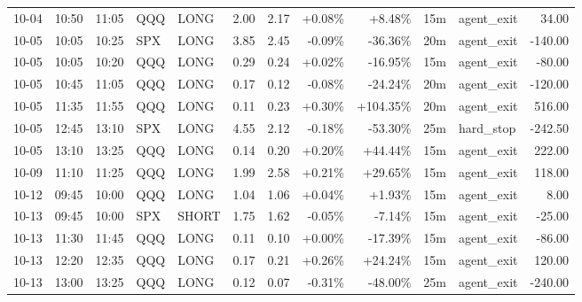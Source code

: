 \documentclass[11pt,a4paper]{article}
\begin{document}
\begin{center}
\begin{longtable}{>{\color{txtmain}}l l l l l r r r r r >{\color{txtmain}}l r}
10-04 & 10:50 & 11:05 & QQQ & LONG & 2.00 & 2.17 & \textcolor{wingreen}{+0.08\%} & \textcolor{wingreen}{+8.48\%} & 15m & agent\_exit & \textcolor{wingreen}{34.00} \\
10-05 & 10:05 & 10:25 & SPX & LONG & 3.85 & 2.45 & \textcolor{lossred}{-0.09\%} & \textcolor{lossred}{-36.36\%} & 20m & agent\_exit & \textcolor{lossred}{-140.00} \\
10-05 & 10:05 & 10:20 & QQQ & LONG & 0.29 & 0.24 & \textcolor{wingreen}{+0.02\%} & \textcolor{lossred}{-16.95\%} & 15m & agent\_exit & \textcolor{lossred}{-80.00} \\
10-05 & 10:45 & 11:05 & QQQ & LONG & 0.17 & 0.12 & \textcolor{lossred}{-0.08\%} & \textcolor{lossred}{-24.24\%} & 20m & agent\_exit & \textcolor{lossred}{-120.00} \\
10-05 & 11:35 & 11:55 & QQQ & LONG & 0.11 & 0.23 & \textcolor{wingreen}{+0.30\%} & \textcolor{wingreen}{+104.35\%} & 20m & agent\_exit & \textcolor{wingreen}{516.00} \\
10-05 & 12:45 & 13:10 & SPX & LONG & 4.55 & 2.12 & \textcolor{lossred}{-0.18\%} & \textcolor{lossred}{-53.30\%} & 25m & hard\_stop & \textcolor{lossred}{-242.50} \\
10-05 & 13:10 & 13:25 & QQQ & LONG & 0.14 & 0.20 & \textcolor{wingreen}{+0.20\%} & \textcolor{wingreen}{+44.44\%} & 15m & agent\_exit & \textcolor{wingreen}{222.00} \\
10-09 & 11:10 & 11:25 & QQQ & LONG & 1.99 & 2.58 & \textcolor{wingreen}{+0.21\%} & \textcolor{wingreen}{+29.65\%} & 15m & agent\_exit & \textcolor{wingreen}{118.00} \\
10-12 & 09:45 & 10:00 & QQQ & LONG & 1.04 & 1.06 & \textcolor{wingreen}{+0.04\%} & \textcolor{wingreen}{+1.93\%} & 15m & agent\_exit & \textcolor{wingreen}{8.00} \\
10-13 & 09:45 & 10:00 & SPX & SHORT & 1.75 & 1.62 & \textcolor{lossred}{-0.05\%} & \textcolor{lossred}{-7.14\%} & 15m & agent\_exit & \textcolor{lossred}{-25.00} \\
10-13 & 11:30 & 11:45 & QQQ & LONG & 0.11 & 0.10 & \textcolor{wingreen}{+0.00\%} & \textcolor{lossred}{-17.39\%} & 15m & agent\_exit & \textcolor{lossred}{-86.00} \\
10-13 & 12:20 & 12:35 & QQQ & LONG & 0.17 & 0.21 & \textcolor{wingreen}{+0.26\%} & \textcolor{wingreen}{+24.24\%} & 15m & agent\_exit & \textcolor{wingreen}{120.00} \\
10-13 & 13:00 & 13:25 & QQQ & LONG & 0.12 & 0.07 & \textcolor{lossred}{-0.31\%} & \textcolor{lossred}{-48.00\%} & 25m & agent\_exit & \textcolor{lossred}{-240.00} \\

\end{longtable}
\end{center}
\end{document}
